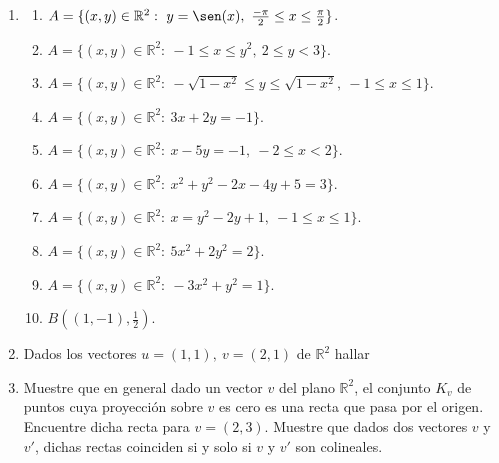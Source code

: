 \documentclass[11pt]{book}
\newcounter{cuent}
\newcommand{\proba}[1]{\stepcounter{cuent}{\alph{cuent})\ }
\displaystyle#1\hfill}
\newcommand{\cuento}{\setcounter{cuent}{0}}
\newcommand{\R}{\mathbb{R}}
\theoremstyle{definicion}
\theoremstyle{teorema}
\theoremstyle{ejemplo}
\begin{document}
\begin{enumerate}

\item 
\begin{enumerate}

\item $A=\{(x,y)\in\R^2:\ y=\sen(x),\ \frac{-\pi}{2}\leq x \leq \frac{\pi}{2}\}$.

\item $A=\{(x,y)\in\R^2:\ -1\leq x \leq y^2,\ 2\leq y < 3\}$.

\item $A=\{(x,y)\in\R^2:\ -\sqrt{1-x^2}\leq y \leq \sqrt{1-x^2},\ -1\leq x \leq 1\}$.

\item $A=\{(x,y)\in\R^2:\ 3x+2y=-1\}$.

\item $A=\{(x,y)\in\R^2:\ x-5y=-1,\ -2\leq x < 2\}$.

\item $A=\{(x,y)\in\R^2:\ x^2+y^2-2x-4y+5=3\}$.

\item $A=\{(x,y)\in\R^2:\ x=y^2-2y+1,\ -1\leq x \leq 1\}$.

\item $A=\{(x,y)\in\R^2:\ 5x^2+2y^2=2\}$.

\item $A=\{(x,y)\in\R^2:\ -3x^2+y^2=1\}$.

\item $B((1,-1),\frac{1}{2})$.

\end{enumerate}

\item Dados los vectores $u=(1,1),\ v=(2,1)$ de $\R^2$ hallar


\cuento

\vspace{0,4cm}

\item Muestre que en general dado un vector $v$ del plano $\R^2$, el conjunto $K_v$ de puntos cuya proyecci\'on sobre $v$ es cero es una recta que pasa por el origen.
Encuentre dicha recta para $v=(2,3)$. Muestre que dados dos vectores $v$ y $v'$, dichas rectas coinciden si y solo si $v$ y $v'$ son colineales. 




\end{enumerate}
\end{document}
